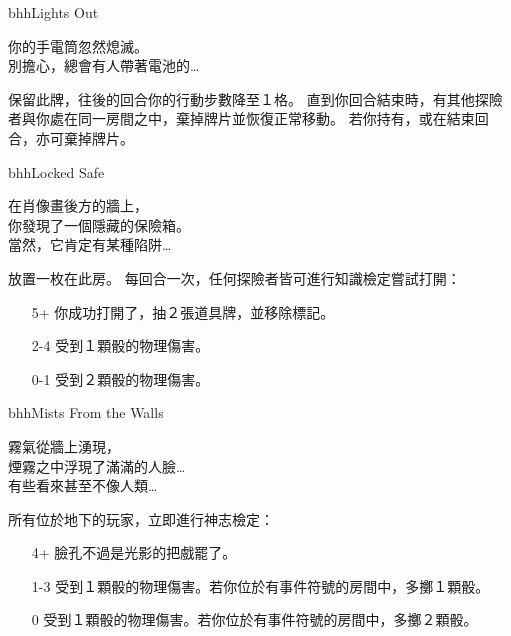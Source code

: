 \begin{EventCard}{bhh}{Lights Out}
  \begin{CardStory}
    你的手電筒忽然熄滅。\\
    別擔心，總會有人帶著電池的…
  \end{CardStory}
  保留此牌，往後的回合你的行動步數降至１格。\smallbreak
  直到你回合結束時，有其他探險者與你處在同一房間之中，棄掉牌片並恢復正常移動。\smallbreak
  若你持有，或在結束回合，亦可棄掉牌片。\smallbreak
\end{EventCard}%
\linebreak[0]%
\begin{EventCard}{bhh}{Locked Safe}
  \begin{CardStory}
    在肖像畫後方的牆上，\\
    你發現了一個隱藏的保險箱。\\
    當然，它肯定有某種陷阱…
  \end{CardStory}
  放置一枚在此房。\smallbreak
  每回合一次，任何探險者皆可進行知識檢定嘗試打開：
  \begin{itemize}
    \item[5+] 你成功打開了，抽２張道具牌，並移除標記。
    \item[2-4] 受到１顆骰的物理傷害。
    \item[0-1] 受到２顆骰的物理傷害。
  \end{itemize}
\end{EventCard}%
\linebreak[0]%
\begin{EventCard}{bhh}{Mists From the Walls}
  \begin{CardStory}
    霧氣從牆上湧現，\\
    煙霧之中浮現了滿滿的人臉…\\
    有些看來甚至不像人類…
  \end{CardStory}
  所有位於地下的玩家，立即進行神志檢定：
  \begin{itemize}
    \item[4+] 臉孔不過是光影的把戲罷了。
    \item[1-3] 受到１顆骰的物理傷害。若你位於有事件符號的房間中，多擲１顆骰。
    \item[0] 受到１顆骰的物理傷害。若你位於有事件符號的房間中，多擲２顆骰。
  \end{itemize}
\end{EventCard}%
\linebreak[0]%
